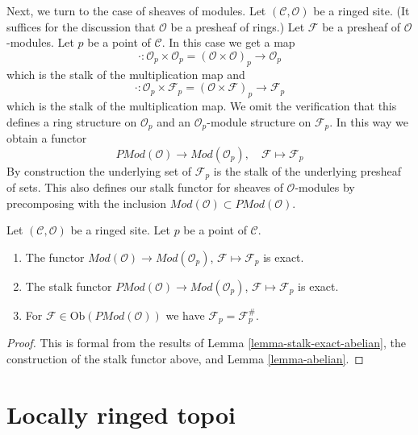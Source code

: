 \noindent
Next, we turn to the case of sheaves of modules.
Let $(\mathcal{C}, \mathcal{O})$ be a ringed site.
(It suffices for the discussion that $\mathcal{O}$ be a presheaf
of rings.)
Let $\mathcal{F}$ be a presheaf of $\mathcal{O}$-modules.
Let $p$ be a point of $\mathcal{C}$. In this case we get a map
$$
\cdot :
\mathcal{O}_p \times \mathcal{O}_p
=
(\mathcal{O} \times \mathcal{O})_p
\longrightarrow
\mathcal{O}_p
$$
which is the stalk of the multiplication map and
$$
\cdot :
\mathcal{O}_p \times \mathcal{F}_p
=
(\mathcal{O} \times \mathcal{F})_p
\longrightarrow
\mathcal{F}_p
$$
which is the stalk of the multiplication map. We omit the verification
that this defines a ring structure on $\mathcal{O}_p$ and an
$\mathcal{O}_p$-module structure on $\mathcal{F}_p$.
In this way we obtain a functor
$$
\textit{PMod}(\mathcal{O}) \longrightarrow \textit{Mod}(\mathcal{O}_p), \quad
\mathcal{F} \longmapsto \mathcal{F}_p
$$
By construction the underlying set of $\mathcal{F}_p$ is the stalk of the
underlying presheaf of sets. This also defines our stalk functor for
sheaves of $\mathcal{O}$-modules by precomposing with the inclusion
$\textit{Mod}(\mathcal{O}) \subset \textit{PMod}(\mathcal{O})$.

\begin{lemma}
\label{lemma-stalk-exact-modules}
Let $(\mathcal{C}, \mathcal{O})$ be a ringed site.
Let $p$ be a point of $\mathcal{C}$.
\begin{enumerate}
\item The functor
$\textit{Mod}(\mathcal{O}) \to \textit{Mod}(\mathcal{O}_p)$,
$\mathcal{F} \mapsto \mathcal{F}_p$ is exact.
\item The stalk functor
$\textit{PMod}(\mathcal{O}) \to \textit{Mod}(\mathcal{O}_p)$,
$\mathcal{F} \mapsto \mathcal{F}_p$
is exact.
\item For $\mathcal{F} \in \text{Ob}(\textit{PMod}(\mathcal{O}))$
we have $\mathcal{F}_p = \mathcal{F}^\#_p$.
\end{enumerate}
\end{lemma}

\begin{proof}
This is formal from the results of
Lemma \ref{lemma-stalk-exact-abelian},
the construction of the stalk functor above, and
Lemma \ref{lemma-abelian}.
\end{proof}









\section{Locally ringed topoi}
\label{section-locally-ringed}


